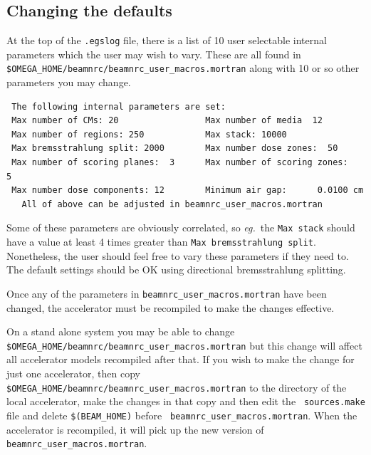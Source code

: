 \documentclass[12pt,twoside]{article}
\newcommand{\eg}{{\em eg.}}
\begin{document}
\subsection{Changing the defaults}
\label{ctd}
At the top of the \verb+.egslog+ file, there is a list of 10 user
selectable internal parameters which the user may wish to vary.  These
are all found in\\
\verb+$OMEGA_HOME/beamnrc/beamnrc_user_macros.mortran+ along
with 10 or so other parameters you may change.
\begin{verbatim}
 The following internal parameters are set:
 Max number of CMs: 20                 Max number of media  12
 Max number of regions: 250            Max stack: 10000
 Max bremsstrahlung split: 2000        Max number dose zones:  50
 Max number of scoring planes:  3      Max number of scoring zones:   5
 Max number dose components: 12        Minimum air gap:      0.0100 cm
   All of above can be adjusted in beamnrc_user_macros.mortran
\end{verbatim}

Some of these parameters are obviously correlated, so \eg\ the
\verb+Max stack+ should have a value at least 4 times greater than
\verb+Max bremsstrahlung split+. Nonetheless, the user should feel free
to vary these parameters if they need to. The default settings should be OK
using directional bremsstrahlung splitting.

Once any of the parameters in {\tt beamnrc\_user\_macros.mortran} have
been changed, the accelerator must be recompiled to make the changes
effective.

On a stand alone system you may be able to change\\
{\tt \$OMEGA\_HOME/beamnrc/beamnrc\_user\_macros.mortran} but this change
will affect all accelerator models recompiled after that.  If you
wish to make the change for just one accelerator, then copy {\tt
\$OMEGA\_HOME/beamnrc/beamnrc\_user\_macros.mortran} to the directory of
the local accelerator, make the changes in that copy and then edit the {\tt
sources.make} file and delete {\tt \$(BEAM\_HOME)} before {\tt
beamnrc\_user\_macros.mortran}.  When the accelerator is recompiled, it
will pick up the new version of {\tt beamnrc\_user\_macros.mortran}.
\end{document}
